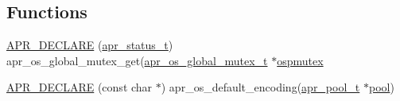 \subsection*{Functions}
\begin{DoxyCompactItemize}
\item 
\hyperlink{group__apr__portabile_gaa7f88d3feeb3c61528419b2c90268085}{A\+P\+R\+\_\+\+D\+E\+C\+L\+A\+RE} (\hyperlink{group__apr__errno_gaa5105fa83cc322f09382292db8b47593}{apr\+\_\+status\+\_\+t}) apr\+\_\+os\+\_\+global\+\_\+mutex\+\_\+get(\hyperlink{structapr__os__global__mutex__t}{apr\+\_\+os\+\_\+global\+\_\+mutex\+\_\+t} $\ast$\hyperlink{group__apr__portabile_ga12fd28a11c71068b98ef2f853017b3bb}{ospmutex}
\item 
\hyperlink{group__apr__portabile_ga68d407683d2c13002ef8bf6ff5b4e820}{A\+P\+R\+\_\+\+D\+E\+C\+L\+A\+RE} (const char $\ast$) apr\+\_\+os\+\_\+default\+\_\+encoding(\hyperlink{structapr__pool__t}{apr\+\_\+pool\+\_\+t} $\ast$\hyperlink{group__APR__XLATE_gabb3cd978f04c73d0b763c391e9bfde73}{pool})
\end{DoxyCompactItemize}
